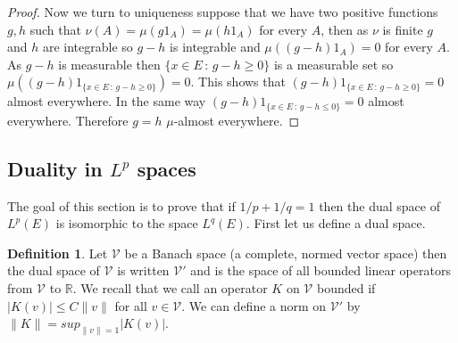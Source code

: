 \documentclass[11pt]{article}
\theoremstyle{definition}
\newtheorem{dfn}[thm]{Definition}
\theoremstyle{remark}
\begin{document}
\begin{proof}
Now we turn to uniqueness suppose that we have two positive functions $g,h$ such that $\nu(A) = \mu(g1_A) = \mu(h1_A)$ for every $A$, then as $\nu$ is finite $g$ and $h$ are integrable so $g-h$ is integrable and $\mu((g-h)1_A) = 0$ for every $A$. As $g-h$ is measurable then $\{x \in E\,:\, g-h \geq 0\}$ is a measurable set so $\mu((g-h)1_{\{x \in E\,:\, g-h \geq 0\}}) = 0$. This shows that $(g-h)1_{\{x \in E\,:\, g-h \geq 0\}} = 0$ almost everywhere. In the same way $(g-h)1_{\{ x \in E\,:\, g-h \leq 0\}} =0$ almost everywhere. Therefore $g=h$ $\mu$-almost everywhere.
\end{proof}

\subsection{Duality in $L^p$ spaces}
The goal of this section is to prove that if $1/p+1/q =1$ then the dual space of $L^p(E)$ is isomorphic to the space $L^q(E)$. First let us define a dual space.
\begin{dfn}
Let $\mathcal{V}$ be a Banach space (a complete, normed vector space) then the dual space of $\mathcal{V}$ is written $\mathcal{V}'$ and is the space of all bounded linear operators from $\mathcal{V}$ to $\mathbb{R}$. We recall that we call an operator $K$ on $\mathcal{V}$ bounded if $|K(v)| \leq C\|v\|$ for all $v \in \mathcal{V}$. We can define a norm on $\mathcal{V}'$ by $\|K\| = sup_{\|v\| =1}|K(v)|$. 
\end{dfn}
\end{document}
